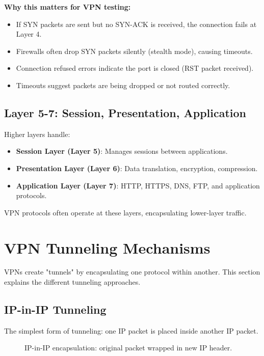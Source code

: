 \textbf{Why this matters for VPN testing:}
\begin{itemize}
    \item If SYN packets are sent but no SYN-ACK is received, the connection fails at Layer 4.
    \item Firewalls often drop SYN packets silently (stealth mode), causing timeouts.
    \item Connection refused errors indicate the port is closed (RST packet received).
    \item Timeouts suggest packets are being dropped or not routed correctly.
\end{itemize}

\subsection{Layer 5-7: Session, Presentation, Application}

Higher layers handle:
\begin{itemize}
    \item \textbf{Session Layer (Layer 5)}: Manages sessions between applications.
    \item \textbf{Presentation Layer (Layer 6)}: Data translation, encryption, compression.
    \item \textbf{Application Layer (Layer 7)}: HTTP, HTTPS, DNS, FTP, and application protocols.
\end{itemize}

VPN protocols often operate at these layers, encapsulating lower-layer traffic.

\section{VPN Tunneling Mechanisms}

VPNs create "tunnels" by encapsulating one protocol within another. This section explains the different tunneling approaches.

\subsection{IP-in-IP Tunneling}

The simplest form of tunneling: one IP packet is placed inside another IP packet.

\begin{figure}[h]
    \centering
    \caption{IP-in-IP encapsulation: original packet wrapped in new IP header.}
\end{figure}

